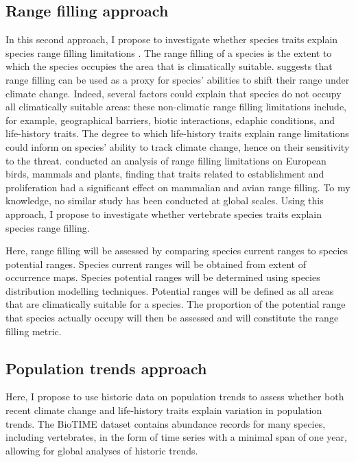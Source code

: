 \subsection{Range filling approach}
In this second approach, I propose to investigate whether species traits explain species range filling limitations \citep{Estrada2018}. The range filling of a species is the extent to which the species occupies the area that is climatically suitable. \citet{Estrada2018} suggests that range filling can be used as a proxy for species’ abilities to shift their range under climate change. Indeed, several factors could explain that species do not occupy all climatically suitable areas: these non-climatic range filling limitations include, for example, geographical barriers, biotic interactions, edaphic conditions, and life-history traits. 
The degree to which life-history traits explain range limitations could inform on species’ ability to track climate change, hence on their sensitivity to the threat. \citet{Estrada2018} conducted an analysis of range filling limitations on European birds, mammals and plants, finding that traits related to establishment and proliferation had a significant effect on mammalian and avian range filling.  To my knowledge, no similar study has been conducted at global scales. Using this approach, I propose to investigate whether vertebrate species traits explain species range filling.

Here, range filling will be assessed by comparing species current ranges to species potential ranges. Species current ranges will be obtained from extent of occurrence maps. Species potential ranges will be determined using species distribution modelling techniques. Potential ranges will be defined as all areas that are climatically suitable for a species. The proportion of the potential range that species actually occupy will then be assessed and will constitute the range filling metric.

\subsection{Population trends approach}
Here, I propose to use historic data on population trends to assess whether both recent climate change and life-history traits explain variation in population trends. The BioTIME dataset \citep{Dornelas2018} contains abundance records for many species, including vertebrates, in the form of time series with a minimal span of one year, allowing for global analyses of historic trends. 

